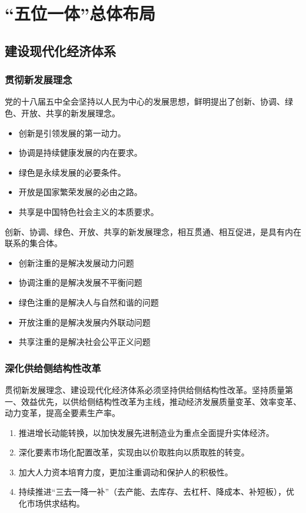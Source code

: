 \chapter{“五位一体”总体布局}

\section{建设现代化经济体系}
    \subsection{贯彻新发展理念}
        党的十八届五中全会坚持以人民为中心的发展思想，鲜明提出了创新、协调、绿色、开放、共享的新发展理念。

        \begin{itemize}
            \item 创新是引领发展的第一动力。
            \item 协调是持续健康发展的内在要求。
            \item 绿色是永续发展的必要条件。
            \item 开放是国家繁荣发展的必由之路。
            \item 共享是中国特色社会主义的本质要求。
        \end{itemize}

        创新、协调、绿色、开放、共享的新发展理念，相互贯通、相互促进，是具有内在联系的集合体。
        \begin{itemize}
            \item 创新注重的是解决发展动力问题
            \item 协调注重的是解决发展不平衡问题
            \item 绿色注重的是解决人与自然和谐的问题
            \item 开放注重的是解决发展内外联动问题
            \item 共享注重的是解决社会公平正义问题
        \end{itemize}

    \subsection{深化供给侧结构性改革}
        贯彻新发展理念、建设现代化经济体系必须坚持供给侧结构性改革。坚持质量第一、效益优先，以供给侧结构性改革为主线，推动经济发展质量变革、效率变革、动力变革，提高全要素生产率。

        \begin{enumerate}
            \item 推进增长动能转换，以加快发展先进制造业为重点全面提升实体经济。
            \item 深化要素市场化配置改革，实现由以价取胜向以质取胜的转变。
            \item 加大人力资本培育力度，更加注重调动和保护人的积极性。
            \item 持续推进“三去一降一补”（去产能、去库存、去杠杆、降成本、补短板），优化市场供求结构。
        \end{enumerate}

